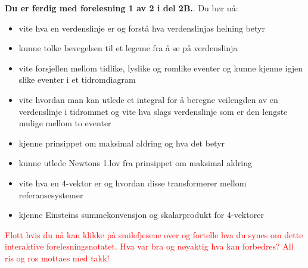 \documentclass{beamer}
\let\hrefori\href
\renewcommand{\href}[2]{{\setlength{\fboxsep}{1pt}\colorbox{sunset}{\hrefori{#1}{#2}}}}
\newcommand{\pagebutton}[1]{\setbeamertemplate{button}{\tikz\node[inner xsep = 5pt, draw = structure!90, fill = green(ryb), rounded corners = 8pt]{\color{amber}\Large\insertbuttontext};}\beamerbutton{#1}}
\begin{document}
\begin{frame}
\label{oppsummering}
\hyperlink{vv6}{\pagebutton{\small Forrige side}}\href{https://nettskjema.no/a/171403}{ \Changey[1][yellow]{-2}}
{\bf Du er ferdig med forelesning 1 av 2 i del 2B.}. Du bør nå:
\begin{itemize}
\item vite hva en verdenslinje er og forstå hva verdenslinjas helning betyr
\item kunne tolke bevegelsen til et legeme fra å se på verdenslinja
\item vite forsjellen mellom tidlike, lyslike og romlike eventer og kunne kjenne igjen slike eventer i et tidromdiagram
\item vite hvordan man kan utlede et integral for å beregne veilengden av en verdenslinje i tidrommet og vite hva slags verdenslinje som er den lengste mulige mellom to eventer
\item kjenne prinsippet om maksimal aldring og hva det betyr
\item kunne utlede Newtons 1.lov fra prinsippet om maksimal aldring
\item vite hva en 4-vektor er og hvordan disse transformerer mellom referansesystemer
\item kjenne Einsteins summekonvensjon og skalarprodukt for 4-vektorer
\end{itemize}
\textcolor{red}{Flott hvis du nå kan klikke på smilefjesene over og fortelle hva du synes om dette interaktive forelesningsnotatet. Hva var bra og nøyaktig hva kan forbedres? All ris og ros mottaes med takk!}
\end{frame}
\end{document}
